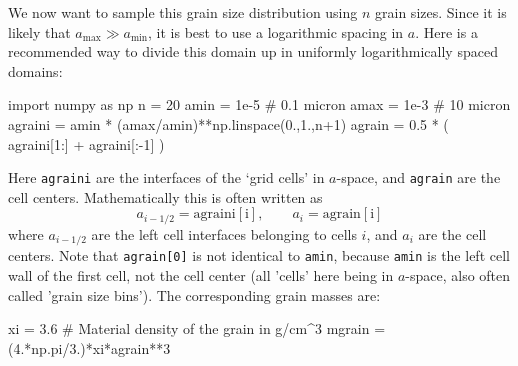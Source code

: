 \documentclass{book}
\newcommand{\code}[1]{{\small\tt #1}}
\begin{document}
We now want to sample this grain size distribution using $n$ grain sizes.
Since it is likely that $a_{\mathrm{max}}\gg a_{\mathrm{min}}$, it is best to
use a logarithmic spacing in $a$. Here is a recommended way to divide this
domain up in uniformly logarithmically spaced domains:
\begin{codebox}
import numpy as np
n           = 20
amin        = 1e-5    # 0.1 micron
amax        = 1e-3    # 10 micron
agraini     = amin * (amax/amin)**np.linspace(0.,1.,n+1)
agrain      = 0.5 * ( agraini[1:] + agraini[:-1] )
\end{codebox}
Here \code{agraini} are the interfaces of the `grid cells' in $a$-space, and
\code{agrain} are the cell centers. Mathematically this is often written as
\begin{equation}
a_{i-1/2} = \mathrm{agraini[i]}, \qquad a_{i} = \mathrm{agrain[i]}
\end{equation}
where $a_{i-1/2}$ are the left cell interfaces belonging to cells $i$, and $a_i$
are the cell centers. Note that \code{agrain[0]} is not identical to
\code{amin}, because \code{amin} is the left cell wall of the first cell, not
the cell center (all 'cells' here being in $a$-space, also often called 'grain
size bins'). The corresponding grain masses are:
\begin{codebox}
xi          = 3.6     # Material density of the grain in g/cm^3
mgrain      = (4.*np.pi/3.)*xi*agrain**3
\end{codebox}
\end{document}
